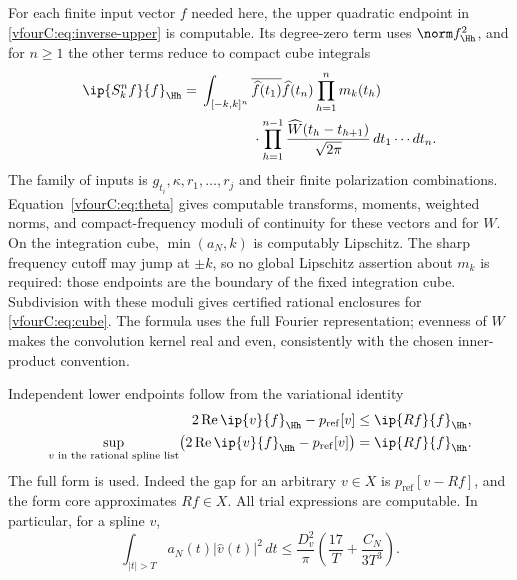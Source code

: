 For each finite input vector $f$ needed here, the upper quadratic endpoint in
\eqref{vfourC:eq:inverse-upper} is computable.  Its degree-zero term uses
$\norm f_{\Hh}^2$, and for $n\ge1$ the other terms reduce to compact cube
integrals
\begin{equation}\label{vfourC:eq:cube}
 \begin{split}
 \ip{S_k^nf}{f}_{\Hh}
 ={}&\int_{[-k,k]^n}\overline{\widehat f(t_1)}\widehat f(t_n)
       \prod_{h=1}^{n}m_k(t_h)\\
 &\hspace{13mm}\cdot
       \prod_{h=1}^{n-1}\frac{\widehat W(t_h-t_{h+1})}{\sqrt{2\pi}}
       \,dt_1\cdots dt_n.
 \end{split}
\end{equation}
The family of inputs is $g_{t_i},\kappa,r_1,\ldots,r_j$ and their finite
polarization combinations.  Equation~\eqref{vfourC:eq:theta} gives computable
transforms, moments, weighted norms, and compact-frequency moduli of continuity
for these vectors and for $W$.  On the integration cube,
$\min(a_N,k)$ is computably Lipschitz.  The sharp frequency cutoff may jump at
$\pm k$, so no global Lipschitz assertion about $m_k$ is required: those
endpoints are the boundary of the fixed integration cube.  Subdivision with
these moduli gives certified rational enclosures for \eqref{vfourC:eq:cube}.
The formula uses the full Fourier representation; evenness of $W$ makes the
convolution kernel real and even, consistently with the chosen inner-product
convention.

Independent lower endpoints follow from the variational identity
\begin{equation}\label{vfourC:eq:inverse-lower}
 \begin{split}
 2\operatorname{Re}\ip{v}{f}_{\Hh}-p_{\mathrm{ref}}[v]
       &\le\ip{Rf}{f}_{\Hh},\\
 \sup_{v\text{ in the rational spline list}}
       \bigl(2\operatorname{Re}\ip{v}{f}_{\Hh}
                      -p_{\mathrm{ref}}[v]\bigr)
       &=\ip{Rf}{f}_{\Hh}.
 \end{split}
\end{equation}
The full form is used.  Indeed the gap for an arbitrary $v\in X$ is
$p_{\mathrm{ref}}[v-Rf]$, and the form core approximates $Rf\in X$.
All trial expressions are computable.  In particular, for a spline $v$,
\begin{equation}\label{vfourC:eq:reference-tail}
 \int_{|t|>T}a_N(t)|\widehat v(t)|^2\,dt
       \le\frac{D_v^2}{\pi}
                   \left(\frac{17}{T}+\frac{C_N}{3T^3}\right).
\end{equation}

